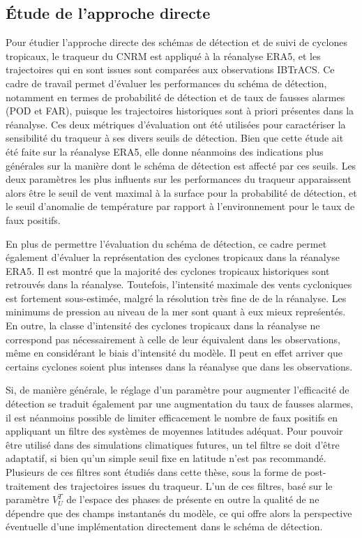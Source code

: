 \documentclass[../main.tex]{subfiles}
\begin{document}
\subsection*{Étude de l'approche directe}

Pour étudier l'approche directe des schémas de détection et de suivi de cyclones tropicaux, le traqueur du CNRM est appliqué à la réanalyse ERA5, et les
trajectoires qui en sont issues sont comparées aux observations IBTrACS. Ce cadre de travail permet d'évaluer les performances du schéma de détection, notamment
en termes de probabilité de détection et de taux de fausses alarmes (POD et FAR), puisque les trajectoires historiques sont à priori présentes dans la
réanalyse. Ces deux métriques d'évaluation ont été utilisées pour caractériser la sensibilité du traqueur à ses divers seuils de détection. Bien que cette étude
ait été faite sur la réanalyse ERA5, elle donne néanmoins des indications plus générales sur la manière dont le schéma de détection est affecté par ces seuils.
Les deux paramètres les plus influents sur les performances du traqueur apparaissent alors être le seuil de vent maximal à la surface pour la probabilité de
détection, et le seuil d'anomalie de température par rapport à l'environnement pour le taux de faux positifs.

En plus de permettre l'évaluation du schéma de détection, ce cadre permet également d'évaluer la représentation des cyclones tropicaux dans la réanalyse ERA5.
Il est montré que la majorité des cyclones tropicaux historiques sont retrouvés dans la réanalyse. Toutefois, l'intensité maximale des vents cycloniques est
fortement sous-estimée, malgré la résolution très fine de  de la réanalyse. Les minimums de pression au niveau de la mer sont quant à eux mieux
repreśentés. En outre, la classe d'intensité des cyclones tropicaux dans la réanalyse ne correspond pas nécessairement à celle de leur équivalent dans les
observations, même en considérant le biais d'intensité du modèle. Il peut en effet arriver que certains cyclones soient plus intenses dans la réanalyse que dans
les observations.

Si, de manière générale, le réglage d'un paramètre pour augmenter l'efficacité de détection se traduit également par une augmentation du taux de fausses
alarmes, il est néanmoins possible de limiter efficacement le nombre de faux positifs en appliquant un filtre des systèmes de moyennes latitudes adéquat. Pour
pouvoir être utilisé dans des simulations climatiques futures, un tel filtre se doit d'être adaptatif, si bien qu'un simple seuil fixe en latitude n'est pas
recommandé. Plusieurs de ces filtres sont étudiés dans cette thèse, sous la forme de post-traitement des trajectoires issues du traqueur. L'un de ces filtres,
basé sur le paramètre $V_U^T$ de l'espace des phases de \textcite{hart_cyclone_2003} présente en outre la qualité de ne dépendre que des champs instantanés du
modèle, ce qui offre alors la perspective éventuelle d'une implémentation directement dans le schéma de détection.
\end{document}
